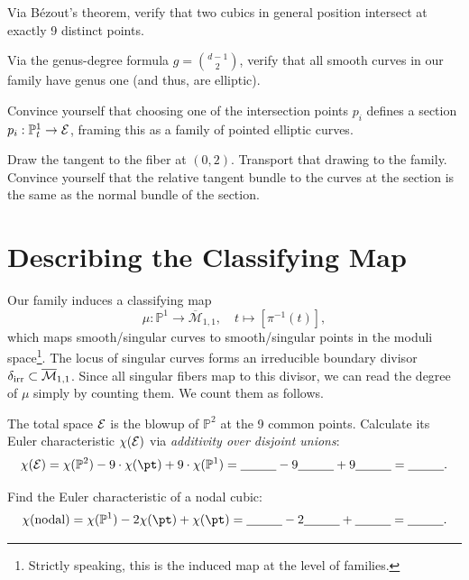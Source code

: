 \documentclass[12pt]{memoir}
\begin{document}
\begin{Ej}
    Via Bézout's theorem, verify that two cubics in general position intersect at exactly 9 distinct points.
\end{Ej}

\begin{Ej}
    Via the genus-degree formula \(g=\binom{d-1}{2}\), verify that all smooth curves in our family have genus one (and thus, are elliptic).
\end{Ej}

\begin{Ej}
    Convince yourself that choosing one of the intersection points \(p_i\) defines a section \(p_i:\mathbb{P}^1_t\to \mathcal{E}\), framing this as a family of pointed elliptic curves.
\end{Ej}

\begin{Ej}
    Draw the tangent to the fiber at \((0,2)\). Transport that drawing to the family. Convince yourself that the relative tangent bundle to the curves at the section is the same as the normal bundle of the section.
\end{Ej}
\section{Describing the Classifying Map}
Our family induces a classifying map
\[
    \mu: \mathbb{P}^1 \to \overline{\mathcal{M}}_{1,1},\quad t \mapsto [\pi^{-1}(t)],
\]
which maps smooth/singular curves to smooth/singular points in the moduli space\footnote{Strictly speaking, this is the induced map at the level of families.}. The locus of singular curves forms an irreducible boundary divisor \(\delta_{\text{irr}}\subset\overline{\mathcal{M}}_{1,1}\). Since all singular fibers map to this divisor, we can read the degree of $\mu$ simply by counting them. We count them as follows.

\begin{Ej}
    The total space $\mathcal{E}$ is the blowup of $\mathbb{P}^2$ at the 9 common points. Calculate its Euler characteristic $\chi(\mathcal{\mathcal{E}})$ via \emph{additivity over disjoint unions}:
    \[
        \chi(\cE) = \chi(\bP^2)-9\cdot\chi(\pt)+9\cdot\chi(\bP^1)=\underline{\hspace{1cm}}-9\underline{\hspace{1cm}}+9\underline{\hspace{1cm}}=\underline{\hspace{1cm}}.
    \]
\end{Ej}

\begin{Ej}
    Find the Euler characteristic of a nodal cubic:
    \[
        \chi(\text{nodal})=\chi(\bP^1)-2\chi(\pt)+\chi(\pt)=\underline{\hspace{1cm}}-2\underline{\hspace{1cm}}+\underline{\hspace{1cm}}=\underline{\hspace{1cm}}.
    \]
\end{Ej}
\end{document}
